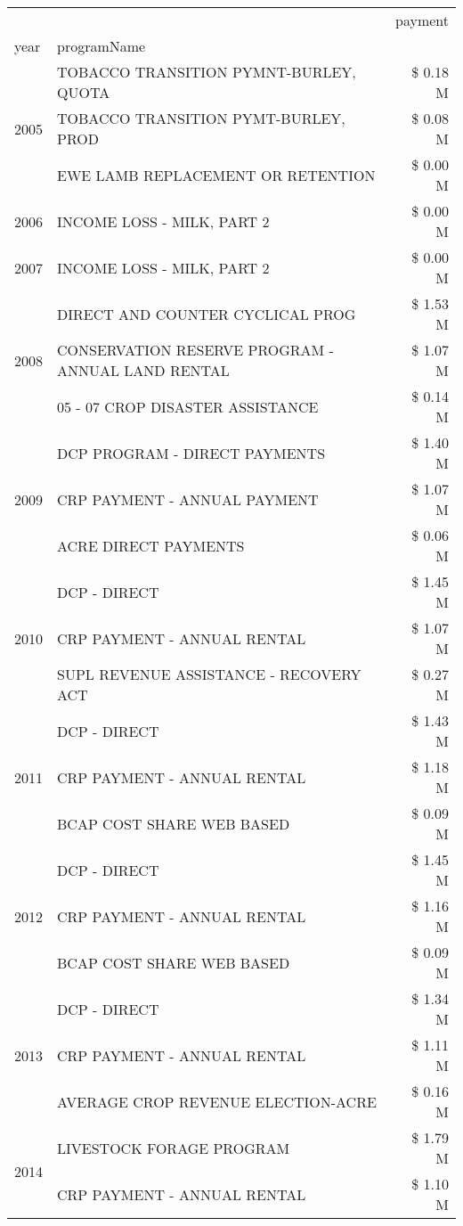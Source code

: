 \begin{tabular}{llr}
\toprule
 &  & payment \\
year & programName &  \\
\midrule
\multirow[t]{3}{*}{2005} & TOBACCO TRANSITION PYMNT-BURLEY, QUOTA & \$ 0.18 M \\
 & TOBACCO TRANSITION PYMT-BURLEY, PROD & \$ 0.08 M \\
 & EWE LAMB REPLACEMENT OR RETENTION & \$ 0.00 M \\
\cline{1-3}
2006 & INCOME LOSS - MILK, PART 2 & \$ 0.00 M \\
\cline{1-3}
2007 & INCOME LOSS - MILK, PART 2 & \$ 0.00 M \\
\cline{1-3}
\multirow[t]{3}{*}{2008} & DIRECT AND COUNTER CYCLICAL PROG & \$ 1.53 M \\
 & CONSERVATION RESERVE PROGRAM - ANNUAL LAND RENTAL & \$ 1.07 M \\
 & 05 - 07 CROP DISASTER ASSISTANCE & \$ 0.14 M \\
\cline{1-3}
\multirow[t]{3}{*}{2009} & DCP PROGRAM - DIRECT PAYMENTS & \$ 1.40 M \\
 & CRP PAYMENT - ANNUAL PAYMENT & \$ 1.07 M \\
 & ACRE DIRECT PAYMENTS & \$ 0.06 M \\
\cline{1-3}
\multirow[t]{3}{*}{2010} & DCP - DIRECT & \$ 1.45 M \\
 & CRP PAYMENT - ANNUAL RENTAL & \$ 1.07 M \\
 & SUPL REVENUE ASSISTANCE - RECOVERY ACT & \$ 0.27 M \\
\cline{1-3}
\multirow[t]{3}{*}{2011} & DCP - DIRECT & \$ 1.43 M \\
 & CRP PAYMENT - ANNUAL RENTAL & \$ 1.18 M \\
 & BCAP COST SHARE WEB BASED & \$ 0.09 M \\
\cline{1-3}
\multirow[t]{3}{*}{2012} & DCP - DIRECT & \$ 1.45 M \\
 & CRP PAYMENT - ANNUAL RENTAL & \$ 1.16 M \\
 & BCAP COST SHARE WEB BASED & \$ 0.09 M \\
\cline{1-3}
\multirow[t]{3}{*}{2013} & DCP - DIRECT & \$ 1.34 M \\
 & CRP PAYMENT - ANNUAL RENTAL & \$ 1.11 M \\
 & AVERAGE CROP REVENUE ELECTION-ACRE & \$ 0.16 M \\
\cline{1-3}
\multirow[t]{3}{*}{2014} & LIVESTOCK FORAGE PROGRAM & \$ 1.79 M \\
 & CRP PAYMENT - ANNUAL RENTAL & \$ 1.10 M \\

\end{tabular}
